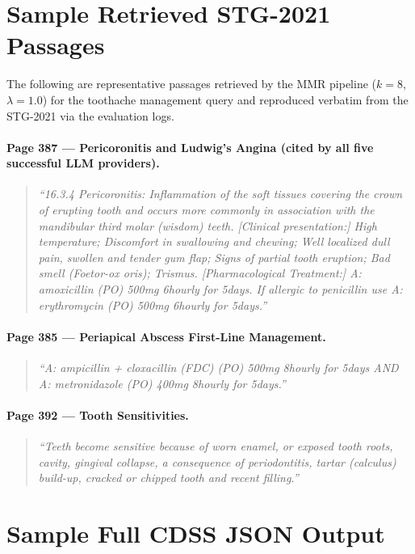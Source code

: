 \documentclass[12pt,a4paper]{report}
\begin{document}
\section{Sample Retrieved STG-2021 Passages}

The following are representative passages retrieved by the MMR pipeline
($k{=}8$, $\lambda{=}1.0$) for the toothache management query and reproduced
verbatim from the STG-2021 via the evaluation logs.

\paragraph{Page 387 --- Pericoronitis and Ludwig's Angina (cited by all five
successful LLM providers).}
\begin{quote}
\small\textit{``16.3.4 Pericoronitis: Inflammation of the soft tissues
covering the crown of erupting tooth and occurs more commonly in association
with the mandibular third molar (wisdom) teeth. [Clinical presentation:]
High temperature; Discomfort in swallowing and chewing; Well localized dull
pain, swollen and tender gum flap; Signs of partial tooth eruption;
Bad smell (Foetor-ox oris); Trismus. [Pharmacological Treatment:]
A: amoxicillin (PO) 500mg 6hourly for 5days. If allergic to penicillin use
A: erythromycin (PO) 500mg 6hourly for 5days.''}
\end{quote}

\paragraph{Page 385 --- Periapical Abscess First-Line Management.}
\begin{quote}
\small\textit{``A: ampicillin + cloxacillin (FDC) (PO) 500mg 8hourly for
5days AND A: metronidazole (PO) 400mg 8hourly for 5days.''}
\end{quote}

\paragraph{Page 392 --- Tooth Sensitivities.}
\begin{quote}
\small\textit{``Teeth become sensitive because of worn enamel, or exposed
tooth roots, cavity, gingival collapse, a consequence of periodontitis,
tartar (calculus) build-up, cracked or chipped tooth and recent filling.''}
\end{quote}

\section{Sample Full CDSS JSON Output}
\end{document}
